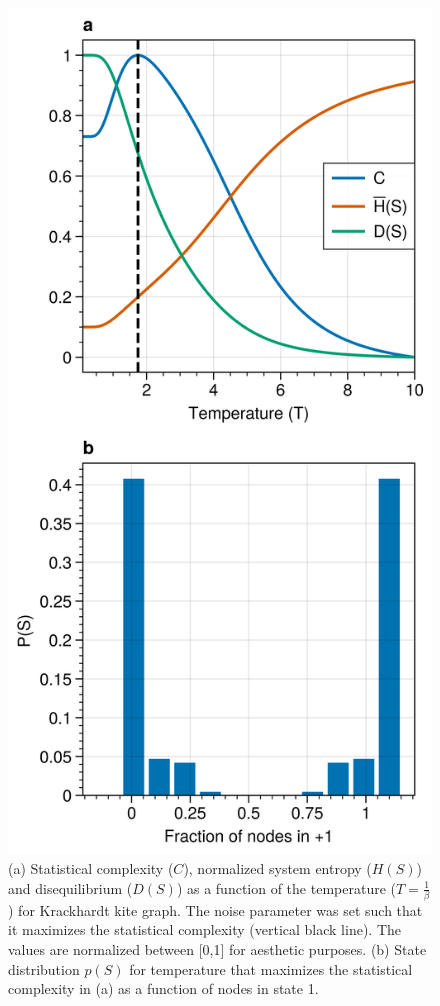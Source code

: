 \documentclass[a4paper, 11pt, twocolumn]{article}
\begin{document}
\begin{figure}[htbp]
\centering
\includegraphics[width=.9\linewidth]{./figures/exact_kite_dyn=ising_beta=0.5732374683235916_T=200_statistical_complexity.png}
\caption{\label{fig:stat_compl}(a) Statistical complexity (\(C\)), normalized system entropy (\(H(S)\)) and disequilibrium (\(D(S)\)) as a function of the temperature (\(T = \frac{1}{\beta}\)) for Krackhardt kite graph. The noise parameter was set such that it maximizes the statistical complexity (vertical black line). The values are normalized between [0,1] for aesthetic purposes. (b) State distribution \(p(S)\) for temperature that maximizes the statistical complexity in (a) as a function of nodes in state 1.}
\end{figure}
\end{document}
